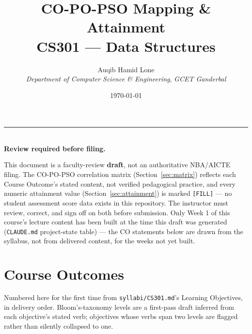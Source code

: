 \documentclass[11pt]{article}
\title{CO-PO-PSO Mapping \& Attainment\\\large CS301 --- Data Structures}
\author{Auqib Hamid Lone\\[0.3em]
  \emph{Department of Computer Science \& Engineering}, \emph{GCET Ganderbal}}
\date{\today}
\newenvironment{noticebox}{%
  \par\noindent\begin{minipage}{\linewidth}\vspace{0.4em}
  \textcolor{negative}{\rule{\linewidth}{1.2pt}}\\[0.3em]
  \textbf{\textcolor{negative}{Review required before filing.}}\ \itshape
}{%
  \end{minipage}\vspace{0.6em}\par
}
\begin{document}
\maketitle

\begin{noticebox}
This document is a faculty-review \textbf{draft}, not an authoritative NBA/AICTE filing. The CO-PO-PSO correlation matrix (Section~\ref{sec:matrix}) reflects each Course Outcome's stated content, not verified pedagogical practice, and every numeric attainment value (Section~\ref{sec:attainment}) is marked \texttt{[FILL]} --- no student assessment score data exists in this repository. The instructor must review, correct, and sign off on both before submission. Only Week 1 of this course's lecture content has been built at the time this draft was generated (\texttt{CLAUDE.md} project-state table) --- the CO statements below are drawn from the syllabus, not from delivered content, for the weeks not yet built.
\end{noticebox}

\section{Course Outcomes}

Numbered here for the first time from \texttt{syllabi/CS301.md}'s Learning Objectives, in delivery order. Bloom's-taxonomy levels are a first-pass draft inferred from each objective's stated verb; objectives whose verbs span two levels are flagged rather than silently collapsed to one.
\end{document}
